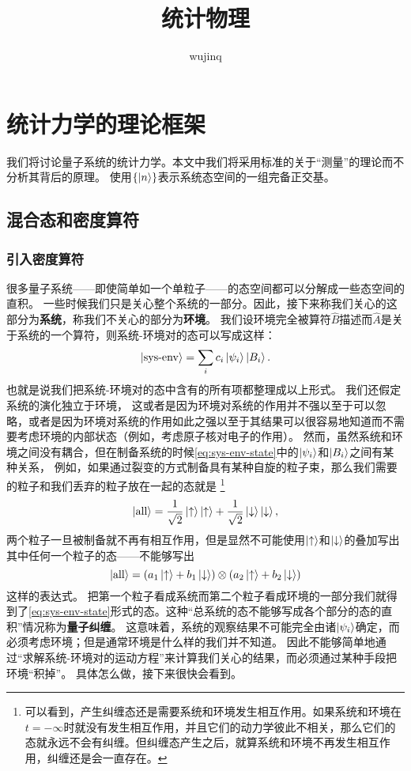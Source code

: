 \documentclass[hyperref, UTF8, a4paper]{ctexart}
\title{统计物理}
\author{wujinq}
\begin{document}
\maketitle


\section{统计力学的理论框架}

我们将讨论量子系统的统计力学。本文中我们将采用标准的关于“测量”的理论而不分析其背后的原理。
使用$\{\ket{n}\}$表示系统态空间的一组完备正交基。

\subsection{混合态和密度算符}

\subsubsection{引入密度算符}\label{sec:introduction-of-density-operator}

很多量子系统——即使简单如一个单粒子——的态空间都可以分解成一些态空间的直积。
一些时候我们只是关心整个系统的一部分。因此，接下来称我们关心的这部分为\textbf{系统}，称我们不关心的部分为\textbf{环境}。
我们设环境完全被算符$\hat{B}$描述而$\hat{A}$是关于系统的一个算符，则系统-环境对的态可以写成这样：
\begin{equation}
    \ket{\text{sys-env}} = \sum_i c_i \ket{\psi_i} \ket{B_i}.
    \label{eq:sys-env-state}
\end{equation}
也就是说我们把系统-环境对的态中含有的所有项都整理成以上形式。
我们还假定系统的演化独立于环境，
这或者是因为环境对系统的作用并不强以至于可以忽略，或者是因为环境对系统的作用如此之强以至于其结果可以很容易地知道而不需要考虑环境的内部状态（例如，考虑原子核对电子的作用）。
然而，虽然系统和环境之间没有耦合，但在制备系统的时候\eqref{eq:sys-env-state}中的$\ket{\psi_i}$和$\ket{B_i}$之间有某种关系，
例如，如果通过裂变的方式制备具有某种自旋的粒子束，那么我们需要的粒子和我们丢弃的粒子放在一起的态就是%
\footnote{可以看到，产生纠缠态还是需要系统和环境发生相互作用。如果系统和环境在$t=-\infty$时就没有发生相互作用，并且它们的动力学彼此不相关，那么它们的态就永远不会有纠缠。但纠缠态产生之后，就算系统和环境不再发生相互作用，纠缠还是会一直存在。}
\[
    \ket{\text{all}} = \frac{1}{\sqrt{2}} \ket{\uparrow} \ket{\uparrow} + \frac{1}{\sqrt{2}} \ket{\downarrow} \ket{\downarrow},
\]
两个粒子一旦被制备就不再有相互作用，但是显然不可能使用$\ket{\uparrow}$和$\ket{\downarrow}$的叠加写出其中任何一个粒子的态——不能够写出
\[
    \ket{\text{all}} = \left( a_1 \ket{\uparrow} + b_1 \ket{\downarrow} \right) \otimes \left( a_2 \ket{\uparrow} + b_2 \ket{\downarrow} \right)
\]
这样的表达式。
把第一个粒子看成系统而第二个粒子看成环境的一部分我们就得到了\eqref{eq:sys-env-state}形式的态。这种“总系统的态不能够写成各个部分的态的直积”情况称为\textbf{量子纠缠}。
这意味着，系统的观察结果不可能完全由诸$\ket{\psi_i}$确定，而必须考虑环境；但是通常环境是什么样的我们并不知道。
因此不能够简单地通过“求解系统-环境对的运动方程”来计算我们关心的结果，而必须通过某种手段把环境“积掉”。
具体怎么做，接下来很快会看到。
\end{document}

